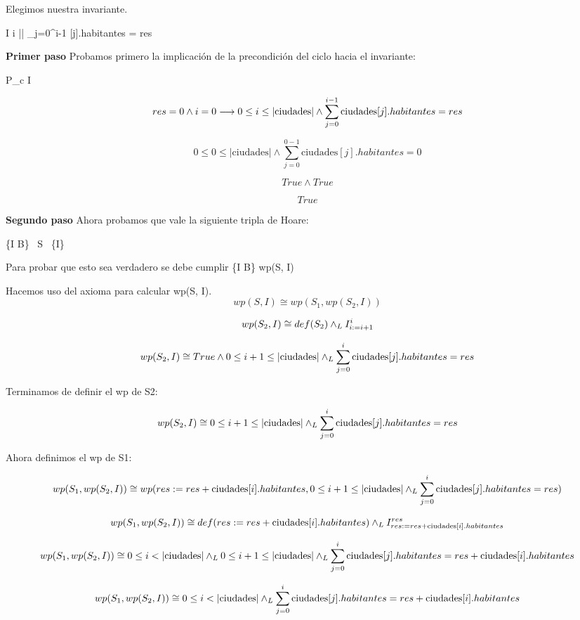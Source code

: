 \documentclass[10pt,a4paper]{article}
\begin{document}
Elegimos nuestra invariante.

I  \leq i \leq || \land \sum_{j=0}^{i-1} [j].habitantes = res

\textbf{Primer paso} Probamos primero la implicación de la precondición del ciclo hacia el invariante:

P_c \implica I

\[
res = 0 \land i = 0 \longrightarrow 0 \leq i \leq |\text{ciudades}| \land \sum_{j=0}^{i-1} \text{ciudades}[j].habitantes = res
\]

\[
 0 \leq 0 \leq |\text{ciudades}| \land \sum_{j=0}^{0-1} \text{ciudades}[j].habitantes = 0
\]

\[
True \land True
\]

\[
True
\]

\newpage

\textbf{Segundo paso} Ahora probamos que vale la siguiente tripla de Hoare:

\{I \land B\} \ S \ \{I\}

Para probar que esto sea verdadero se debe cumplir \{I \land B\} \implica wp(S, I)   

Hacemos uso del axioma para calcular wp(S, I).
\[
wp(S, I) \cong wp(S_1, wp(S_2, I))
\]

\[
wp(S_2, I) \cong def(S_2) \land _L I_{i := i+1}^{i}
\]

\[
wp(S_2, I) \cong True \land 0 \leq i+1 \leq |\text{ciudades}| \land _L \sum_{j=0}^{i} \text{ciudades}[j].habitantes = res
\]

Terminamos de definir el wp de S2:

\[
wp(S_2, I) \cong 0 \leq i+1 \leq |\text{ciudades}| \land _L \sum_{j=0}^{i} \text{ciudades}[j].habitantes = res
\]

Ahora definimos el wp de S1:

\[
wp(S_1, wp(S_2, I)) \cong wp(res := res + \text{ciudades}[i].habitantes, 0 \leq i+1 \leq |\text{ciudades}| \land _L \sum_{j=0}^{i} \text{ciudades}[j].habitantes = res)
\]

\[
wp(S_1, wp(S_2, I)) \cong def(res := res + \text{ciudades}[i].habitantes) \land _L I_{res := res + \text{ciudades}[i].habitantes}^{res}
\]

\[
wp(S_1, wp(S_2, I)) \cong 0 \leq i < |\text{ciudades}| \land _L 0 \leq i+1 \leq |\text{ciudades}| \land _L \sum_{j=0}^{i} \text{ciudades}[j].habitantes = res + \text{ciudades}[i].habitantes
\]

\[
wp(S_1, wp(S_2, I)) \cong 0 \leq i < |\text{ciudades}| \land _L \sum_{j=0}^{i} \text{ciudades}[j].habitantes = res + \text{ciudades}[i].habitantes
\]
\end{document}

